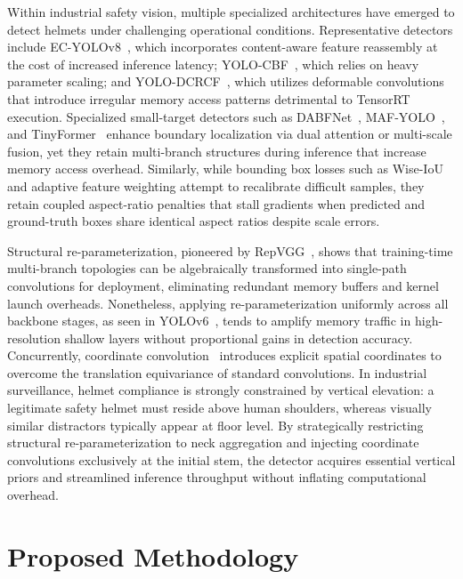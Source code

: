 \documentclass[conference]{IEEEtran}
\begin{document}
Within industrial safety vision, multiple specialized architectures have emerged to detect helmets under challenging operational conditions. Representative detectors include EC-YOLOv8~\cite{ecyolov8_2024}, which incorporates content-aware feature reassembly at the cost of increased inference latency; YOLO-CBF~\cite{yolocbf_2025}, which relies on heavy parameter scaling; and YOLO-DCRCF~\cite{zhao2025yolodcrcf}, which utilizes deformable convolutions that introduce irregular memory access patterns detrimental to TensorRT execution. Specialized small-target detectors such as DABFNet~\cite{dabfnet2024}, MAF-YOLO~\cite{mafyolo2024}, and TinyFormer~\cite{tinyformer2024} enhance boundary localization via dual attention or multi-scale fusion, yet they retain multi-branch structures during inference that increase memory access overhead. Similarly, while bounding box losses such as Wise-IoU~\cite{tong2023wise} and adaptive feature weighting attempt to recalibrate difficult samples, they retain coupled aspect-ratio penalties that stall gradients when predicted and ground-truth boxes share identical aspect ratios despite scale errors.

Structural re-parameterization, pioneered by RepVGG~\cite{ding2021repvgg}, shows that training-time multi-branch topologies can be algebraically transformed into single-path convolutions for deployment, eliminating redundant memory buffers and kernel launch overheads. Nonetheless, applying re-parameterization uniformly across all backbone stages, as seen in YOLOv6~\cite{li2023yolov6}, tends to amplify memory traffic in high-resolution shallow layers without proportional gains in detection accuracy. Concurrently, coordinate convolution~\cite{liu2018coordconv} introduces explicit spatial coordinates to overcome the translation equivariance of standard convolutions. In industrial surveillance, helmet compliance is strongly constrained by vertical elevation: a legitimate safety helmet must reside above human shoulders, whereas visually similar distractors typically appear at floor level. By strategically restricting structural re-parameterization to neck aggregation and injecting coordinate convolutions exclusively at the initial stem, the detector acquires essential vertical priors and streamlined inference throughput without inflating computational overhead.

\section{Proposed Methodology}
\label{sec:method}
\end{document}
